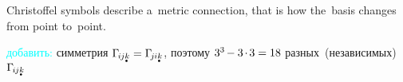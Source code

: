 \begin{otherlanguage}{russian}
\vspace{.2em} Christoffel symbols describe a~metric connection, that is how the~basis changes from point to~point.

\vspace{.2em} \noindent \textcolor{cyan}{добавить:} симметрия ${ \Gamma_{\hspace{-0.25ex}i\hspace{-0.1ex}j\mathdotbelow{k}} = \Gamma_{\hspace{-0.33ex}j\hspace{-0.06ex}i\mathdotbelow{k}} }$, поэтому ${3^3 \hspace{-0.2ex} - 3 \hspace{-0.2ex}\cdot\hspace{-0.2ex} 3 = 18}$ разных~(независимых) ${\Gamma_{\hspace{-0.25ex}i\hspace{-0.1ex}j\mathdotbelow{k}}}$


\end{otherlanguage}
